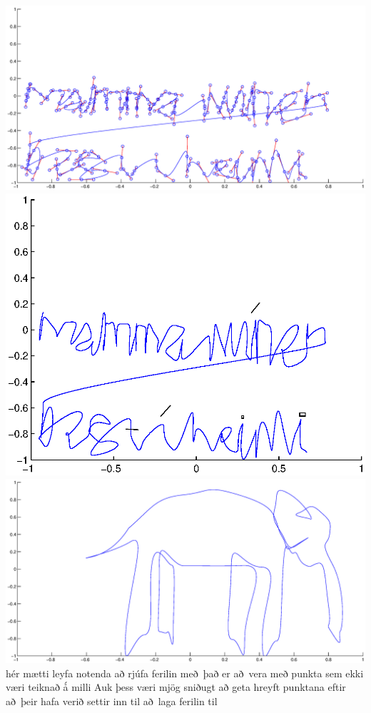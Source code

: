 \documentclass[a4]{article}
\begin{document}
\includegraphics[width=\textwidth]{mamma1.eps}\\
\includegraphics[height=0.495\textheight]{mamma2.eps}\\
\includegraphics[width=\textwidth]{fill.eps}
hér mætti leyfa notenda að rjúfa ferilin með það er að vera með punkta sem ekki væri teiknað ǻ milli 
Auk þess væri mjög sniðugt að geta hreyft punktana eftir að þeir hafa verið settir inn til að laga ferilin til
\end{document}
